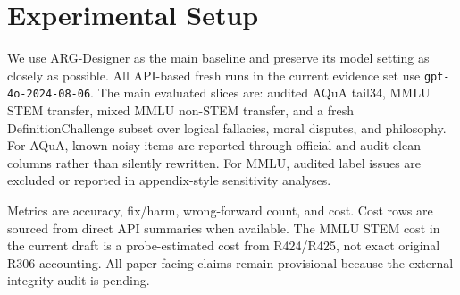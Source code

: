 \section{Experimental Setup}
\label{sec:setup}

We use ARG-Designer as the main baseline and preserve its model setting as closely as possible. All API-based fresh runs in the current evidence set use \texttt{gpt-4o-2024-08-06}. The main evaluated slices are: audited AQuA tail34, MMLU STEM transfer, mixed MMLU non-STEM transfer, and a fresh DefinitionChallenge subset over logical fallacies, moral disputes, and philosophy. For AQuA, known noisy items are reported through official and audit-clean columns rather than silently rewritten. For MMLU, audited label issues are excluded or reported in appendix-style sensitivity analyses.

Metrics are accuracy, fix/harm, wrong-forward count, and cost. Cost rows are sourced from direct API summaries when available. The MMLU STEM cost in the current draft is a probe-estimated cost from R424/R425, not exact original R306 accounting. All paper-facing claims remain provisional because the external integrity audit is pending.
